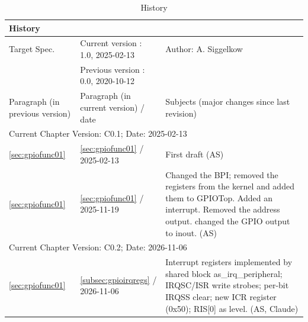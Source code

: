 \begin{table}[H]
\caption{History}
\label{tab:gpiohistory02}
\centering
\begin{tabularx}{\textwidth}{|X |X |X |}
  \hline
  \multicolumn{3}{|l|}{History} \\
  \hline
  \multicolumn{1}{|l}{Target Spec.} & \multicolumn{1}{l}{Current version : 1.0, 2025-02-13} & \multicolumn{1}{l|}{Author: A. Siggelkow}\\
  \multicolumn{1}{|l}{ } & \multicolumn{1}{l}{Previous version : 0.0, 2020-10-12} & \multicolumn{1}{l|}{ }\\
  \hline
  \hline
  Paragraph (in previous version) & Paragraph (in current version) / date & Subjects (major changes since last revision) \\
  \hline
  \hline
  \multicolumn{3}{|l|}{Current Chapter Version: C0.1; Date: 2025-02-13} \\
  \hline
  \ref{sec:gpiofunc01} & \ref{sec:gpiofunc01} / 2025-02-13 & First draft (AS) \\
  \hline
  \ref{sec:gpiofunc01} & \ref{sec:gpiofunc01} / 2025-11-19 & Changed the BPI; removed the registers from the kernel and added them to GPIOTop. Added an interrupt. Removed the address output. changed the GPIO output to inout. (AS) \\
  \hline
  \multicolumn{3}{|l|}{Current Chapter Version: C0.2; Date: 2026-11-06} \\
  \hline
  \ref{sec:gpiofunc01} & \ref{subsec:gpioirqregs} / 2026-11-06 & Interrupt registers implemented by shared block as\_irq\_peripheral; IRQSC/ISR write strobes; per-bit IRQSS clear; new ICR register (0x50); RIS[0] as level. (AS, Claude) \\
  \hline
\end{tabularx}
\end{table}
